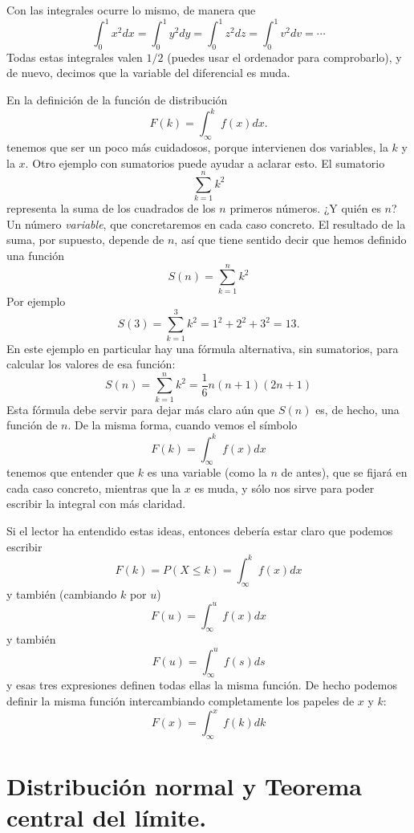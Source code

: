 Con las integrales ocurre lo mismo, de manera que
\[\int_0^1 x^2 dx = \int_0^1 y^2 dy = \int_0^1 z^2 dz = \int_0^1 v^2 dv = \cdots \]
Todas estas integrales valen $1/2$ (puedes usar el ordenador para comprobarlo), y de nuevo, decimos
que la variable del diferencial es muda.

En la definición de la función de distribución
\[F(k)=\int_{\infty}^{k} f(x)dx.\]
tenemos que ser un poco más cuidadosos, porque intervienen dos variables, la $k$ y la $x$. Otro ejemplo con sumatorios puede ayudar a aclarar esto. El sumatorio
\[\sum_{k=1}^n k^2 \]
representa la suma de los cuadrados de los $n$ primeros números. ¿Y quién es $n$? Un número {\em
variable}, que concretaremos en cada caso concreto. El resultado de la suma, por supuesto, depende
de $n$, así que tiene sentido decir que hemos definido una función
\[S(n)=\sum_{k=1}^n k^2\]
Por ejemplo
\[S(3)=\sum_{k=1}^3 k^2 = 1^2 + 2^2+ 3^2 = 13.\]
En este ejemplo en particular hay una fórmula alternativa, sin sumatorios, para calcular los
valores de esa función:
\[S(n)=\sum_{k=1}^n k^2 = \dfrac{1}{6}n(n+1)(2n+1)\]
Esta fórmula debe servir para dejar más claro aún que $S(n)$ es, de hecho, una función de $n$.  De
la misma forma, cuando vemos el símbolo
\[F(k)=\int_{\infty}^{k} f(x)dx\]
tenemos que entender que $k$ es una variable (como la $n$ de antes), que se fijará en cada caso concreto, mientras que la $x$ es muda, y sólo nos sirve para poder escribir la integral con más claridad.

Si el lector ha entendido estas ideas, entonces debería estar claro que podemos escribir
\[F(k)=P(X\leq k)=\int_{\infty}^{k} f(x)dx\]
y también (cambiando $k$ por $u$)
\[F(u)=\int_{\infty}^{u} f(x)dx\]
y también
\[F(u)=\int_{\infty}^{u} f(s)ds\]
y esas tres expresiones definen todas ellas la misma función. De hecho podemos definir la misma función intercambiando completamente los papeles de $x$ y $k$:
\[F(x)=\int_{\infty}^{x} f(k)dk\]

\section{Distribución normal y Teorema central del límite.}
\label{cap05:sec:DistribucionNormalTCL}

